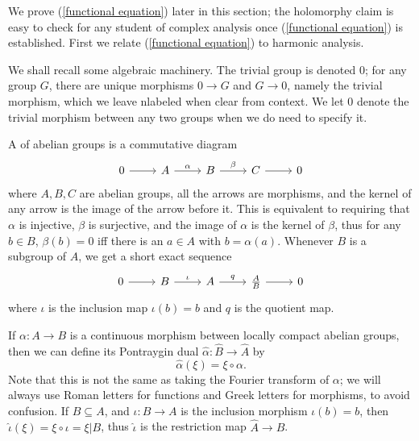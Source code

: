 We prove (\ref{functional equation}) later in this section; the holomorphy claim is easy to check for any student of complex analysis once (\ref{functional equation}) is established.
First we relate (\ref{functional equation}) to harmonic analysis.

We shall recall some algebraic machinery.
The trivial group is denoted $0$; for any group $G$, there are unique morphisms $0 \to G$ and $G \to 0$, namely the trivial morphism, which we leave nlabeled when clear from context.
We let $0$ denote the trivial morphism between any two groups when we do need to specify it.

A  of abelian groups is a commutative diagram
\[\begin{tikzcd}
0 \arrow[r] & A \arrow[r,"\alpha"] & B \arrow[r,"\beta"] & C \arrow[r] & 0
\end{tikzcd}
\]
where $A,B,C$ are abelian groups, all the arrows are morphisms, and the kernel of any arrow is the image of the arrow before it.
This is equivalent to requiring that $\alpha$ is injective, $\beta$ is surjective, and the image of $\alpha$ is the kernel of $\beta$, thus for any $b \in B$, $\beta(b) = 0$ iff there is an $a \in A$ with $b = \alpha(a)$.
Whenever $B$ is a subgroup of $A$, we get a short exact sequence
\begin{equation}\label{quotient SES}
\begin{tikzcd}
0 \arrow[r] & B \arrow[r,"\iota"] & A \arrow[r,"q"] & \frac{A}{B} \arrow[r] & 0
\end{tikzcd}
\end{equation}
where $\iota$ is the inclusion map $\iota(b) =b$ and $q$ is the quotient map.

If $\alpha: A \to B$ is a continuous morphism between locally compact abelian groups, then we can define its Pontraygin dual $\hat{\alpha}: \hat{B} \to \hat{A}$ by
\[\hat{\alpha}(\xi) = \xi \circ \alpha.\]
Note that this is not the same as taking the Fourier transform of $\alpha$; we will always use Roman letters for functions and Greek letters for morphisms, to avoid confusion.
If $B \subseteq A$, and $\iota: B \to A$ is the inclusion morphism $\iota(b) = b$, then $\hat{\iota}(\xi) = \xi \circ \iota = \xi|B$, thus $\hat{\iota}$ is the restriction map $\hat{A} \to \hat{B}$.

